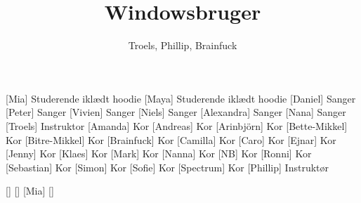 \documentclass[a4paper,11pt]{article}
\title{Windowsbruger}
\author{Troels, Phillip, Brainfuck}
\begin{document}
\maketitle

\begin{roles}
[Mia] Studerende iklædt hoodie
[Maya] Studerende iklædt hoodie
[Daniel] Sanger
[Peter] Sanger
[Vivien] Sanger
[Niels] Sanger
[Alexandra] Sanger
[Nana] Sanger
[Troels] Instruktor
[Amanda] Kor
[Andreas] Kor
[Arinbjörn] Kor
[Bette-Mikkel] Kor
[Bitre-Mikkel] Kor
[Brainfuck] Kor
[Camilla] Kor
[Caro] Kor
[Ejnar] Kor
[Jenny] Kor
[Klaes] Kor
[Mark] Kor
[Nanna] Kor
[NB] Kor
[Ronni] Kor
[Sebastian] Kor
[Simon] Kor
[Sofie] Kor
[Spectrum] Kor
[Phillip] Instruktør
\end{roles}

\begin{props}
[]
[]
[Mia]
[]
\end{props}
\end{document}
